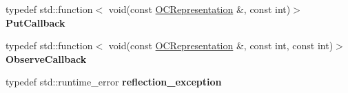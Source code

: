\begin{DoxyCompactItemize}
\item 
\hypertarget{namespaceOC_a129b1c84cc5975da1ad42e4a0ac020bc}{}typedef std\+::function$<$ void(const \hyperlink{classOC_1_1OCRepresentation}{O\+C\+Representation} \&, const int)$>$ {\bfseries Put\+Callback}\label{namespaceOC_a129b1c84cc5975da1ad42e4a0ac020bc}

\item 
\hypertarget{namespaceOC_ad5fcc1928b4011f1fa552384ad8c5e7e}{}typedef std\+::function$<$ void(const \hyperlink{classOC_1_1OCRepresentation}{O\+C\+Representation} \&, const int, const int)$>$ {\bfseries Observe\+Callback}\label{namespaceOC_ad5fcc1928b4011f1fa552384ad8c5e7e}

\item 
\hypertarget{namespaceOC_a48d8ec42792dd0cfdd56ea31ad7c778c}{}typedef std\+::runtime\+\_\+error {\bfseries reflection\+\_\+exception}\label{namespaceOC_a48d8ec42792dd0cfdd56ea31ad7c778c}

\end{DoxyCompactItemize}
